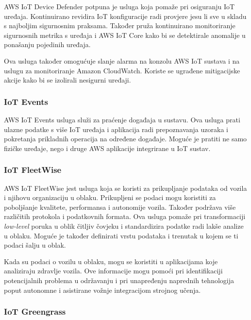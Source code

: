 AWS IoT Device Defender potpuna je usluga koja pomaže pri osiguranju IoT uređaja. Kontinuirano revidira IoT konfiguracije radi provjere jesu li sve u skladu s najboljim sigurnosnim praksama. Također pruža kontinuirano monitoriranje sigurnosnih metrika s uređaja i AWS IoT Core kako bi se detektirale anomalije u ponašanju pojedinih uređaja. 

Ova usluga također omogućuje slanje alarma na konzolu AWS IoT sustava i na uslugu za monitoriranje Amazon CloudWatch. Koriste se ugrađene mitigacijske akcije kako bi se izolirali nesigurni uređaji.

\subsubsection{IoT Events}

AWS IoT Events usluga služi za praćenje događaja u sustavu. Ova usluga prati ulazne podatke s više IoT uređaja i aplikacija radi prepoznavanja uzoraka i pokretanja prikladnih operacija na određene događaje. Moguće je pratiti ne samo fizičke uređaje, nego i druge AWS aplikacije integrirane u IoT sustav.

\subsubsection{IoT FleetWise}

AWS IoT FleetWise jest usluga koja se koristi za prikupljanje podataka od vozila i njihovu organizaciju u oblaku. Prikupljeni se podaci mogu koristiti za poboljšanje kvalitete, performansa i autonomije vozila. Također podržava više različitih protokola i podatkovnih formata. Ova usluga pomaže pri transformaciji \textit{low-level} poruka u oblik čitljiv čovjeku i standardizira podatke radi lakše analize u oblaku. Moguće je također definirati vrstu podataka i trenutak u kojem se ti podaci šalju u oblak.

Kada su podaci o vozilu u oblaku, mogu se koristiti u aplikacijama koje analiziraju zdravlje vozila. Ove informacije mogu pomoći pri identifikaciji potencijalnih problema u održavanju i pri unapređenju naprednih tehnologija poput autonomne i asistirane vožnje integracijom strojnog učenja.

\subsubsection{IoT Greengrass}


